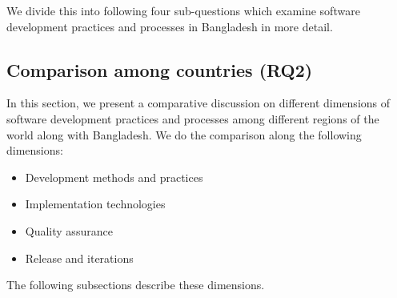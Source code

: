 We divide this into following four sub-questions which examine software development practices and processes in Bangladesh in more detail.






\subsection{Comparison among countries (RQ2)}
\label{RQ2}

In this section, we present a comparative discussion on different dimensions of software development practices and processes among different regions of the world along with Bangladesh. We do the comparison along the following dimensions:

\begin{itemize}
    \item Development methods and practices
    \item Implementation technologies
    \item Quality assurance
    \item Release and iterations
\end{itemize}

The following subsections describe these dimensions.










% 
% 
